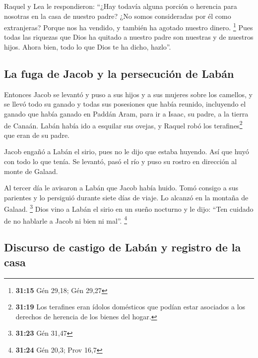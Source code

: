  Raquel y Lea le respondieron: ``¿Hay todavía alguna
porción o herencia para nosotras en la casa de nuestro padre?
 ¿No somos consideradas por él como extranjeras? Porque
nos ha vendido, y también ha agotado nuestro dinero. \footnote{\textbf{31:15}
  Gén 29,18; Gén 29,27}  Pues todas las riquezas que Dios
ha quitado a nuestro padre son nuestras y de nuestros hijos. Ahora bien,
todo lo que Dios te ha dicho, hazlo''.

\hypertarget{la-fuga-de-jacob-y-la-persecuciuxf3n-de-labuxe1n}{%
\subsection{La fuga de Jacob y la persecución de
Labán}\label{la-fuga-de-jacob-y-la-persecuciuxf3n-de-labuxe1n}}

 Entonces Jacob se levantó y puso a sus hijos y a sus
mujeres sobre los camellos,  y se llevó todo su ganado y
todas sus posesiones que había reunido, incluyendo el ganado que había
ganado en Paddán Aram, para ir a Isaac, su padre, a la tierra de Canaán.
 Labán había ido a esquilar sus ovejas, y Raquel robó los
terafines\footnote{\textbf{31:19} Los terafines eran ídolos domésticos
  que podían estar asociados a los derechos de herencia de los bienes
  del hogar.} que eran de su padre.

 Jacob engañó a Labán el sirio, pues no le dijo que
estaba huyendo.  Así que huyó con todo lo que tenía. Se
levantó, pasó el río y puso su rostro en dirección al monte de Galaad.

 Al tercer día le avisaron a Labán que Jacob había huido.
 Tomó consigo a sus parientes y lo persiguió durante
siete días de viaje. Lo alcanzó en la montaña de Galaad. \footnote{\textbf{31:23}
  Gén 31,47}  Dios vino a Labán el sirio en un sueño
nocturno y le dijo: ``Ten cuidado de no hablarle a Jacob ni bien ni
mal''. \footnote{\textbf{31:24} Gén 20,3; Prov 16,7}

\hypertarget{discurso-de-castigo-de-labuxe1n-y-registro-de-la-casa}{%
\subsection{Discurso de castigo de Labán y registro de la
casa}\label{discurso-de-castigo-de-labuxe1n-y-registro-de-la-casa}}

